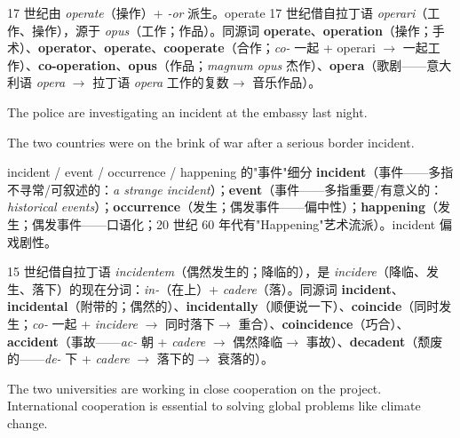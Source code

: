 \documentclass[../main.tex]{subfiles}
\begin{document}
\begin{origin}
17 世纪由 \textit{operate}（操作）+ \textit{-or} 派生。operate 17 世纪借自拉丁语 \textit{operari}（工作、操作），源于 \textit{opus}（工作；作品）。同源词 \textbf{operate}、\textbf{operation}（操作；手术）、\textbf{operator}、\textbf{operate}、\textbf{cooperate}（合作；\textit{co-} 一起 + operari $\to$ 一起工作）、\textbf{co-operation}、\textbf{opus}（作品；\textit{magnum opus} 杰作）、\textbf{opera}（歌剧——意大利语 \textit{opera} $\to$ 拉丁语 \textit{opera} 工作的复数$\to$ 音乐作品）。
\end{origin}


{The police are investigating an incident at the embassy last night.}

{The two countries were on the brink of war after a serious border incident.}

\begin{gram}{incident / event / occurrence / happening 的"事件"细分}
\textbf{incident}（事件——多指不寻常/可叙述的：\textit{a strange incident}）；\textbf{event}（事件——多指重要/有意义的：\textit{historical events}）；\textbf{occurrence}（发生；偶发事件——偏中性）；\textbf{happening}（发生；偶发事件——口语化；20 世纪 60 年代有"Happening"艺术流派）。incident 偏戏剧性。
\end{gram}

\begin{origin}
15 世纪借自拉丁语 \textit{incidentem}（偶然发生的；降临的），是 \textit{incidere}（降临、发生、落下）的现在分词：\textit{in-}（在上）+ \textit{cadere}（落）。同源词 \textbf{incident}、\textbf{incidental}（附带的；偶然的）、\textbf{incidentally}（顺便说一下）、\textbf{coincide}（同时发生；\textit{co-} 一起 + \textit{incidere} $\to$ 同时落下$\to$ 重合）、\textbf{coincidence}（巧合）、\textbf{accident}（事故——\textit{ac-} 朝 + \textit{cadere} $\to$ 偶然降临$\to$ 事故）、\textbf{decadent}（颓废的——\textit{de-} 下 + \textit{cadere} $\to$ 落下的$\to$ 衰落的）。
\end{origin}


{The two universities are working in close cooperation on the project.}
{International cooperation is essential to solving global problems like climate change.}
\end{document}
